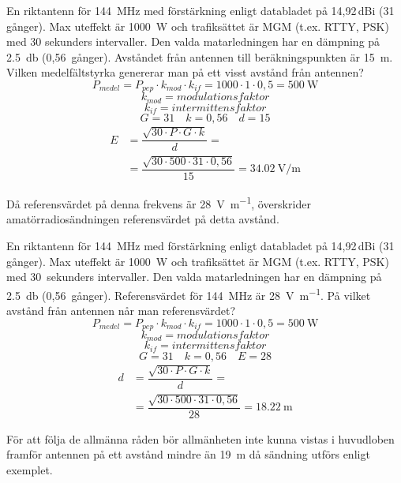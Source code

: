 \begin{tcolorbox}[title=Exempel 1]
En riktantenn för \qty{144}{\mega\hertz} med förstärkning enligt databladet på
14,92\,dBi (31 gånger).
Max uteffekt är \qty{1000}{\watt} och trafiksättet är MGM (t.ex. RTTY, PSK) med
30 sekunders intervaller.
Den valda matarledningen har en dämpning på \qty{2,5}{\decibel} (0,56~gånger).
Avståndet från antennen till beräkningspunkten är \qty{15}{\metre}.
Vilken medelfältstyrka genererar man på ett visst avstånd från antennen?
\tcblower
\[P_{medel} = P_{pep} \cdot k_{mod} \cdot k_{if}
= 1000 \cdot 1 \cdot 0,5 = \qty{500}{\watt}\]
\[k_{mod} = modulationsfaktor\]
\[k_{if} = intermittensfaktor\]
\[G = 31 \quad k = 0,56 \quad d = 15\]
\begin{align*}
  E &= \dfrac{\sqrt{30 \cdot P \cdot G \cdot k}}{d} =\\
&= \dfrac{\sqrt{30 \cdot 500 \cdot 31 \cdot 0,56}}{15}
= \qty{34,02}{\volt\per\metre}
\end{align*}

Då referensvärdet på denna frekvens är \qty{28}{\volt\per\metre}, överskrider
amatörradiosändningen referensvärdet på detta avstånd.
\end{tcolorbox}

\begin{tcolorbox}[title=Exempel 2]
En riktantenn för \qty{144}{\mega\hertz} med förstärkning enligt databladet på
14,92\,dBi (31 gånger).
Max uteffekt är \qty{1000}{\watt} och trafiksättet är MGM (t.ex. RTTY, PSK) med
30~sekunders intervaller.
Den valda matarledningen har en dämpning på \qty{2,5}{\decibel} (0,56~gånger).
Referensvärdet för \qty{144}{\mega\hertz} är \qty{28}{\volt\per\metre}.
På vilket avstånd från antennen når man referensvärdet?
\tcblower
\[P_{medel} = P_{pep} \cdot k_{mod} \cdot k_{if}
= 1000 \cdot 1 \cdot 0,5 = \qty{500}{\watt}\]
\[k_{mod} = \textit{modulationsfaktor}\]
\[k_{if} = \textit{intermittensfaktor}\]
\[G = 31 \quad k = 0,56 \quad E = 28\]
\begin{align*}
  d &= \dfrac{\sqrt{30 \cdot P \cdot G \cdot k}}{d} =\\
&= \dfrac{\sqrt{30 \cdot 500 \cdot 31 \cdot 0,56}}{28}
  = \qty{18,22}{\metre}
  \end{align*}

För att följa de allmänna råden bör allmänheten inte kunna vistas i huvudloben
framför antennen på ett avstånd mindre än \qty{19}{\metre} då sändning utförs
enligt exemplet.
\end{tcolorbox}


